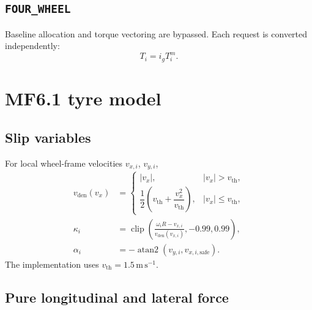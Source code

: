 \documentclass[11pt,a4paper]{article}
\newcommand{\clip}{\operatorname{clip}}
\begin{document}
\subsection{\texttt{FOUR\_WHEEL}}

Baseline allocation and torque vectoring are bypassed. Each request is
converted independently:
\begin{equation}
  T_i=i_gT_i^m.
\end{equation}

\section{MF6.1 tyre model}

\subsection{Slip variables}

For local wheel-frame velocities \(v_{x,i}\), \(v_{y,i}\),
\begin{align}
  v_{\mathrm{den}}(v_x) &=
  \begin{cases}
  |v_x|, & |v_x|>v_{\mathrm{th}},\\
  \dfrac{1}{2}\left(v_{\mathrm{th}}+
  \dfrac{v_x^2}{v_{\mathrm{th}}}\right), & |v_x|\leq v_{\mathrm{th}},
  \end{cases}\\
  \kappa_i &=
  \clip\left(\frac{\omega_iR-v_{x,i}}{v_{\mathrm{den}}(v_{x,i})},
  -0.99,0.99\right),\\
  \alpha_i &=-\operatorname{atan2}(v_{y,i},v_{x,i,\mathrm{safe}}).
\end{align}
The implementation uses \(v_{\mathrm{th}}=1.5\,\mathrm{m\,s^{-1}}\).

\subsection{Pure longitudinal and lateral force}
\end{document}
